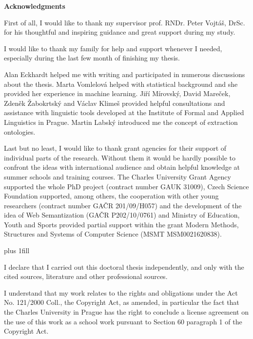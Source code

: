 \documentclass[12pt,a4paper,twoside,openright]{report}
\begin{document}
\newpage


{\Huge\bfseries Acknowledgments 
 \par\nobreak \vskip 20pt
}

\noindent First of all, I would like to thank my supervisor prof. RNDr. Peter Vojt\'{a}\v{s}, DrSc. for his thoughtful and inspiring guidance and great support during my study. 

I would like to thank my family for help and support whenever I needed, especially during the last few month of finishing my thesis.

Alan Eckhardt helped me with writing and participated in numerous discussions about the thesis. Marta Vomlelov\'{a} helped with statistical background and she provided her experience in machine learning. Jiří Mírovský, David Mareček, Zdeněk Žabokrtský and Václav Klimeš provided helpful consultations and assistance with linguistic tools developed at the Institute of Formal and Applied Linguistics in Prague. Martin Labský introduced me the concept of extraction ontologies.

Last but no least, I would like to thank grant agencies for their support of individual parts of the research. Without them it would be hardly possible to confront the ideas with international audience and obtain helpful knowledge at summer schools and training courses. The Charles University Grant Agency supported the whole PhD project (contract number GAUK 31009), Czech Science Foundation supported, among others, the cooperation with other young researchers (contract number GAČR 201/09/H057) and the development of the idea of Web Semantization (GAČR P202/10/0761) and Ministry of Education, Youth and Sports provided partial support within the grant Modern Methods, Structures and Systems of Computer Science (MSMT MSM0021620838).


\newpage


\vglue 0pt plus 1fill

\noindent
I declare that I carried out this doctoral thesis independently, and only with the cited
sources, literature and other professional sources.

\medskip\noindent
I understand that my work relates to the rights and obligations under the Act No.
121/2000 Coll., the Copyright Act, as amended, in particular the fact that the Charles
University in Prague has the right to conclude a license agreement on the use of this
work as a school work pursuant to Section 60 paragraph 1 of the Copyright Act.
\end{document}
